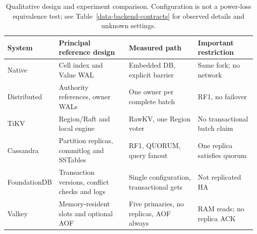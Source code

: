 \documentclass[11pt,a4paper]{article}
\begin{document}
\begin{table}[htbp]\centering\small
\begin{tabular}{p{2.2cm}p{3.7cm}p{3.9cm}p{3.5cm}}\toprule
System & Principal reference design & Measured path & Important restriction\\\midrule
Native & Cell index and Value WAL & Embedded DB, explicit barrier & Same fork; no network\\
Distributed & Authority references, owner WALs & One owner per complete batch & RF1, no failover\\
TiKV & Region/Raft and local engine & RawKV, one Region voter & No transactional batch claim\\
Cassandra & Partition replicas, commitlog and SSTables & RF1, QUORUM, query fanout & One replica satisfies quorum\\
FoundationDB & Transaction versions, conflict checks and logs & Single configuration, transactional gets & Not replicated HA\\
Valkey & Memory-resident slots and optional AOF & Five primaries, no replicas, AOF always & RAM reads; no replica ACK\\\bottomrule
\end{tabular}
\caption{Qualitative design and experiment comparison. Configuration is not a power-loss equivalence test; see Table~\ref{data-backend-contracts} for observed details and unknown settings.}\label{tab:architecture-comparison}\end{table}
\end{document}
